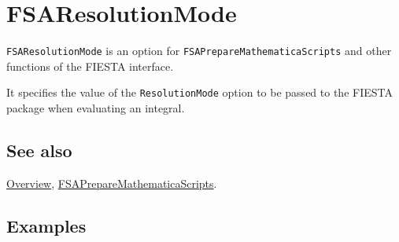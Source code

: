\documentclass[../FeynHelpersManual.tex]{subfiles}
\begin{document}
\hypertarget{fsaresolutionmode}{
\section{FSAResolutionMode}\label{fsaresolutionmode}}

\texttt{FSAResolutionMode} is an option for
\texttt{FSAPrepareMathematicaScripts} and other functions of the FIESTA
interface.

It specifies the value of the \texttt{ResolutionMode} option to be
passed to the FIESTA package when evaluating an integral.

\subsection{See also}

\hyperlink{toc}{Overview},
\hyperlink{fsapreparemathematicascripts}{FSAPrepareMathematicaScripts}.

\subsection{Examples}
\end{document}
